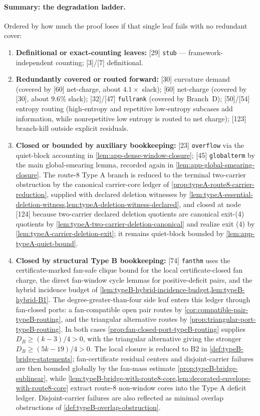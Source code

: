 \documentclass[11pt]{article}
\begin{document}
\paragraph{Summary: the degradation ladder.}
Ordered by how much the proof loses if that single leaf fails with no redundant cover:
\begin{enumerate}[label=\arabic*., leftmargin=1.8em]
\item \textbf{Definitional or exact-counting leaves:} {[29]} \texttt{stub} --- framework-independent counting; {[3]}/{[7]} definitional.
\item \textbf{Redundantly covered or routed forward:} {[30]} curvature demand (covered by {[60]} net-charge, about $4.1\times$ slack); {[60]} net-charge (covered by {[30]}, about $9.6\%$ slack); {[32]}/{[47]} \texttt{fullrank} (covered by Branch~D); {[50]}/{[54]} entropy routing (high-entropy and repetitive low-entropy subcases add information, while nonrepetitive low entropy is routed to net charge); {[123]} branch-kill outside explicit residuals.
\item \textbf{Closed or bounded by auxiliary bookkeeping:} {[23]} \texttt{overflow} via the quiet-block accounting in \cref{lem:app-dense-window-closure}; {[45]} \texttt{globalterm} by the main global-smearing lemma, recorded again in \cref{lem:app-global-smearing-closure}.  The route-8 Type A branch is reduced to the terminal two-carrier obstruction by the canonical carrier-core ledger of \cref{prop:typeA-route8-carrier-reduction}, supplied with declared deletion witnesses by \cref{lem:typeA-essential-deletion-witness,lem:typeA-deletion-witness-declared}, and closed at node {[124]} because two-carrier declared deletion quotients are canonical exit-(4) quotients by \cref{lem:typeA-two-carrier-deletion-canonical} and realize exit (4) by \cref{lem:typeA-carrier-deletion-exit}; it remains quiet-block bounded by \cref{lem:app-typeA-quiet-bound}.
\item \textbf{Closed by structural Type B bookkeeping:} {[74]} \texttt{fanthm} uses the certificate-marked fan-safe clique bound for the local certificate-closed fan charge, the direct fan-window cycle lemmas for positive-deficit pairs, and the hybrid incidence budget of \cref{lem:typeB-hybrid-incidence-budget,lem:typeB-hybrid-B1}.  The degree-greater-than-four side leaf enters this ledger through fan-closed ports: a fan-compatible open pair routes by \cref{cor:compatible-pair-typeB-routing}, and the triangular alternative routes by \cref{prop:triangular-port-typeB-routing}.  In both cases \cref{prop:fan-closed-port-typeB-routing} supplies \(D_B\ge(k-3)/4>0\), with the triangular alternative giving the stronger \(D_B\ge(5k-19)/4>0\).  The local closure is reduced to B2 in \cref{def:typeB-bridge-statements}; fan-certificate residual centers and disjoint-carrier failures are then bounded globally by the fan-mass estimate \cref{prop:typeB-bridge-sublinear}, while \cref{lem:typeB-bridge-with-route8-core,lem:decorated-envelope-with-route8-core} extract route-8 non-window cores into the Type A deficit ledger.  Disjoint-carrier failures are also reflected as minimal overlap obstructions of \cref{def:typeB-overlap-obstruction}.

\end{enumerate}
\end{document}
